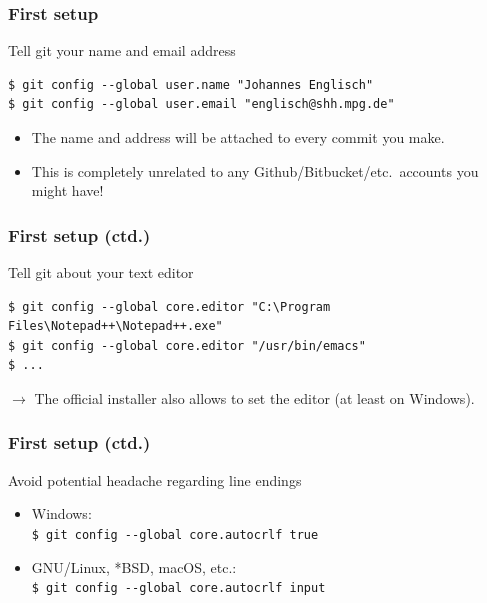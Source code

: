 \documentclass[12pt]{beamer}
\begin{document}
\begin{frame}[fragile]
  \frametitle{First setup}

  \begin{block}{Tell git your name and email address}
    {\footnotesize{}%
      \begin{verbatim}
$ git config --global user.name "Johannes Englisch"
$ git config --global user.email "englisch@shh.mpg.de"
      \end{verbatim}%
    }
    \begin{itemize}
      \item The name and address will be attached to \alert{every commit} you
        make.
      \item This is completely unrelated to any
        Github/\hspace{0}Bitbucket/\hspace{0}etc.\ accounts you might have!
    \end{itemize}
  \end{block}
\end{frame}

\begin{frame}[fragile]
  \frametitle{First setup (ctd.)}

  \begin{block}{Tell git about your text editor}
    {\footnotesize{}%
      \begin{verbatim}
$ git config --global core.editor "C:\Program Files\Notepad++\Notepad++.exe"
$ git config --global core.editor "/usr/bin/emacs"
$ ...
      \end{verbatim}%
    }
    $\to$ The official installer also allows to set the editor
    (at least on Windows).
  \end{block}
\end{frame}

\begin{frame}[fragile]
  \frametitle{First setup (ctd.)}

  \begin{block}{Avoid potential headache regarding line endings}
    \begin{itemize}
      \item Windows: \\{}
        {\footnotesize{}\verb"$ git config --global core.autocrlf true"}
      \item GNU/Linux, *BSD, macOS, etc.:\\{}
        {\footnotesize{}\verb"$ git config --global core.autocrlf input"}
    \end{itemize}
  \end{block}
\end{frame}
\end{document}
